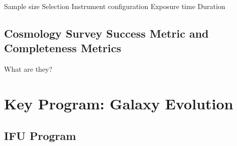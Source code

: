 \documentclass[11pt,a4paper,twoside,onecolumn,openany,final,oldfontcommands]{memoir}
\begin{document}
\begin{programrequirement}

\reqitem Sample size
\reqitem Selection 
\reqitem Instrument configuration 
\reqitem Exposure time
\reqitem Duration

\end{programrequirement}

\section{Cosmology Survey Success Metric and Completeness Metrics}

What are they?

\newpage


\chapter{Key Program: Galaxy Evolution}\label{prog:galaxies}

\section{IFU Program}\label{prog:galaxies-IFU}

\end{document}
